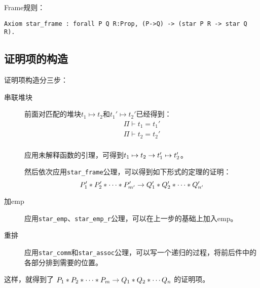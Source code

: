 Frame规则：
\begin{verbatim}
Axiom star_frame : forall P Q R:Prop, (P->Q) -> (star P R -> star Q R).
\end{verbatim}

\subsection{证明项的构造}
证明项构造分三步：
\begin{description}
  \item[串联堆块] 前面对匹配的堆块$t_1 \mapsto t_2$和$t_1' \mapsto t_2'$已经得到：
    \begin{eqnarray*}
      \Pi \vdash t_1 = t_1' \\
      \Pi \vdash t_2 = t_2' \\
    \end{eqnarray*}
    
    应用未解释函数的引理，可得到$t_1 \mapsto t_2 \rightarrow t_1' \mapsto t_2'$。

    然后依次应用\texttt{star\_frame}公理，可以得到如下形式的定理的证明：
    $$P_1' \ast P_2' \ast \cdots \ast P_{m'}' \rightarrow Q_1' \ast Q_2' \ast \cdots \ast Q_{n'}'$$
  \item[加emp] 应用\texttt{star\_emp}、\texttt{star\_emp\_r}公理，可以在上一步的基础上加入emp。
  \item[重排] 应用\texttt{star\_comm}和\texttt{star\_assoc}公理，可以写一个递归的过程，将前后件中的各部分排到需要的位置。
\end{description}

这样，就得到了
$P_1 \ast P_2 \ast \cdots \ast P_m \rightarrow Q_1 \ast Q_2 \ast \cdots Q_n$
的证明项。
